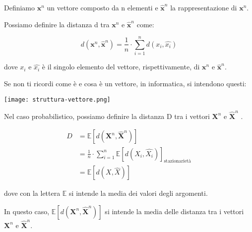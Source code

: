 Definiamo $\mathbf{x}^{n}$ un vettore composto da n elementi e $\hat{\mathbf{x}}^{n}$ la rappresentazione di $\mathbf{x}^{n}$. \newline 

Possiamo definire la distanza d tra $\mathbf{x}^{n}$ e $\hat{\mathbf{x}}^{n}$ come: 

{
    \Large 
    \begin{equation}
        d(\mathbf{x}^{n}, \hat{\mathbf{x}}^{n}) = \frac{1}{n} \cdot \sum_{i = 1}^{n} d(x_i, \hat{x_i})
    \end{equation}
}

dove $x_i$ e $\hat{x_i}$ è il singolo elemento del vettore, rispettivamente, di $\mathbf{x}^{n}$ e $\hat{\mathbf{x}}^{n}$. \newline 

\begin{tcolorbox}
    Se non ti ricordi come è e cosa è un vettore, in informatica, si intendono questi: 

    \texttt{[image: struttura-vettore.png]}
\end{tcolorbox}

Nel caso probabilistico, possiamo definire la distanza D tra i vettori $\mathbf{X}^{n}$ e $\hat{\mathbf{X}}^{n}$ . \newline 

{
    \Large 
    \begin{equation}
        \begin{split}
            D 
            &= 
            \mathbb{E} \left[ d(\mathbf{X}^{n}, \hat{\mathbf{X}}^{n}) \right] 
            \\
            &= 
            \frac{1}{n}
            \cdot 
            \sum_{i = 1}^{n}
            \mathbb{E} \left[ d(X_i, \hat{X_i}) \right]_{\text{stazionarietà}}
            \\
            &= 
            \mathbb{E} \left[ d(X, \hat{X}) \right]
        \end{split}
    \end{equation}
}

dove con la lettera $\mathbb{E}$ si intende la media dei valori degli argomenti. \newline 

In questo caso, $\mathbb{E} \left[ d(\mathbf{X}^{n}, \hat{\mathbf{X}}^{n}) \right] $ si intende la media delle distanza tra i vettori $\mathbf{X}^{n}$ e $\hat{\mathbf{X}}^{n}$. \newline 

\newpage 

